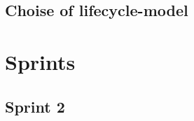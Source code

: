 \documentclass[12pt]{report}
\begin{document}
	

	


		
		

		

		

		

		

		

		

		


		

		

		

		

\chapter{Choise of lifecycle-model}

	

	


\part{Sprints}


	

\chapter{Sprint 2}
\end{document}
